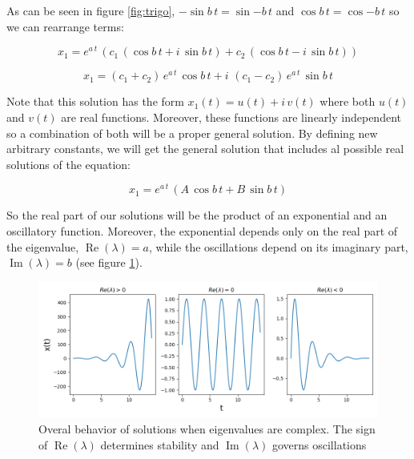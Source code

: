 \documentclass{tufte-book} %
\begin{document}
As can be seen in  figure \ref{fig:trigo}, $- \sin{b \, t}=\sin{- b \, t}$ and $\cos{b \, t}=\cos{ - b \, t}$ so we can rearrange terms:

\begin{equation}
	x_1= e^{a \, t} \,  \left( c_1  \, \left(  \cos{ b \, t} + i \, \sin{ b \, t} \right)+ c_2 \, \left( \cos{ b \, t} - i \, \sin{ b \, t} \right) \right) \nonumber
\end{equation}


\begin{equation}
	x_1=   \left( c_1+c_2\right) \, e^{a \, t} \, \cos{ b \, t}  + i \, \,\left( c_1-c_2 \right) \,e^{a \, t} \,   \sin{ b \, t}   \nonumber
\end{equation}

Note that this solution has the form $x_1(t) = u(t) + i \, v(t)$ where both $u(t)$ and $v(t)$ are real functions. Moreover, these functions are linearly independent so a combination of both will be a proper general solution. By defining new arbitrary constants, we will get the general solution that includes al possible real solutions of the equation:

\begin{equation}
	x_1=   e^{a \, t} \,  \left(  A  \, \cos{ b \, t}  +  B  \,   \sin{ b \, t}  \right) \nonumber
\end{equation}

So the real part of our solutions will be the product of an exponential and an oscillatory function. Moreover, the exponential depends only on the real part of the eigenvalue, $\operatorname{Re}(\lambda) = a$, while the oscillations depend on its imaginary part,  $\operatorname{Im}(\lambda) =b$ (see figure \ref{fig:cmplxeigen}). 

\begin{figure}
	\begin{center}
		\includegraphics[width=\textwidth]{complex_eigen}
	\end{center}
	\caption{Overal behavior of solutions when eigenvalues are complex. The sign of $\operatorname{Re}(\lambda)$ determines stability and $\operatorname{Im}(\lambda)$ governs oscillations}
	\label{fig:cmplxeigen}
\end{figure}
\end{document}
